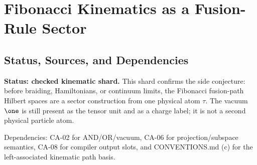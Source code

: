 
\section{Fibonacci Kinematics as a Fusion-Rule Sector}
\label{sec:fibonacci-kinematic-sector}

\subsection{Status, Sources, and Dependencies}

\textbf{Status: checked kinematic shard.}  This shard confirms the side
conjecture: before braiding, Hamiltonians, or continuum limits, the Fibonacci
fusion-path Hilbert spaces are a sector construction from one physical atom
\(\tau\).  The vacuum \(\one\) is still present as the tensor unit and as a charge
label; it is not a second physical particle atom.

Dependencies: CA-02 for AND/OR/vacuum, CA-06 for projection/subspace semantics,
CA-08 for compiler output slots, and CONVENTIONS.md (c) for the left-associated
kinematic path basis.

